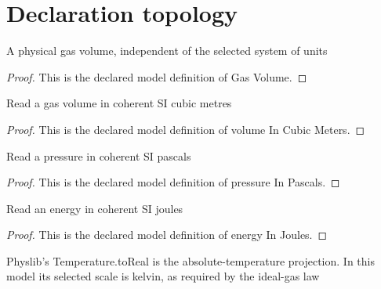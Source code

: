 \section{Declaration topology}
\begin{definition}
  \label{def:physics:phyx-mini-0345:phyxminiproblems-problemphyxmini0345-gasvolume}
  A physical gas volume, independent of the selected system of units
\end{definition}
\begin{proof}
  This is the declared model definition of Gas Volume.
\end{proof}
\begin{definition}
  \label{def:physics:phyx-mini-0345:phyxminiproblems-problemphyxmini0345-volumeincubicmeters}
  Read a gas volume in coherent SI cubic metres
\end{definition}
\begin{proof}
  This is the declared model definition of volume In Cubic Meters.
\end{proof}
\begin{definition}
  \label{def:physics:phyx-mini-0345:phyxminiproblems-problemphyxmini0345-pressureinpascals}
  Read a pressure in coherent SI pascals
\end{definition}
\begin{proof}
  This is the declared model definition of pressure In Pascals.
\end{proof}
\begin{definition}
  \label{def:physics:phyx-mini-0345:phyxminiproblems-problemphyxmini0345-energyinjoules}
  Read an energy in coherent SI joules
\end{definition}
\begin{proof}
  This is the declared model definition of energy In Joules.
\end{proof}
\begin{definition}
  \label{def:physics:phyx-mini-0345:phyxminiproblems-problemphyxmini0345-temperatureinkelvins}
  Physlib's Temperature.toReal is the absolute-temperature projection. In this model its selected scale is kelvin, as required by the ideal-gas law
\end{definition}
